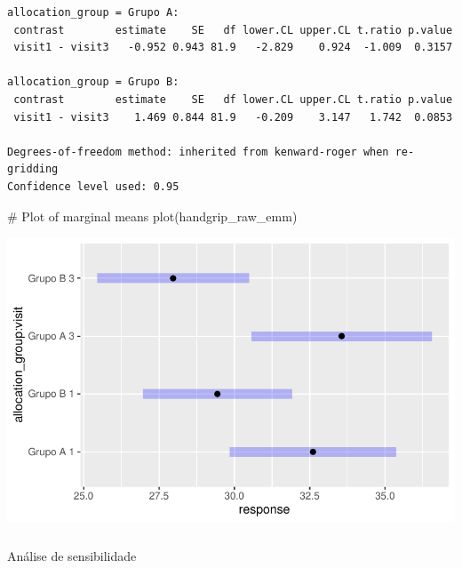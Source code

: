 \documentclass[
  12pt,
]{article}
\makeatletter
\let\oldsubparagraph\subparagraph
\renewcommand{\subparagraph}{
    \@ifstar
      \xxxSubParagraphStar
      \xxxSubParagraphNoStar
  }
\newcommand{\xxxSubParagraphStar}[1]{\oldsubparagraph*{#1}\mbox{}}
\newcommand{\xxxSubParagraphNoStar}[1]{\oldsubparagraph{#1}\mbox{}}
\newenvironment{Shaded}{\begin{snugshade}}{\end{snugshade}}
\newcommand{\CommentTok}[1]{\textcolor[rgb]{0.37,0.37,0.37}{#1}}
\newcommand{\FunctionTok}[1]{\textcolor[rgb]{0.28,0.35,0.67}{#1}}
\newcommand{\NormalTok}[1]{\textcolor[rgb]{0.00,0.23,0.31}{#1}}
\makeatother
\begin{document}
\begin{verbatim}
allocation_group = Grupo A:
 contrast        estimate    SE   df lower.CL upper.CL t.ratio p.value
 visit1 - visit3   -0.952 0.943 81.9   -2.829    0.924  -1.009  0.3157

allocation_group = Grupo B:
 contrast        estimate    SE   df lower.CL upper.CL t.ratio p.value
 visit1 - visit3    1.469 0.844 81.9   -0.209    3.147   1.742  0.0853

Degrees-of-freedom method: inherited from kenward-roger when re-gridding 
Confidence level used: 0.95 
\end{verbatim}

\begin{Shaded}
\begin{Highlighting}[]
\CommentTok{\# Plot of marginal means}
\FunctionTok{plot}\NormalTok{(handgrip\_raw\_emm)}
\end{Highlighting}
\end{Shaded}

\includegraphics{Outcomes_files/figure-pdf/handgrip_raw_emm-1.pdf}

\subparagraph{Análise de
sensibilidade}\label{anuxe1lise-de-sensibilidade-20}
\end{document}
